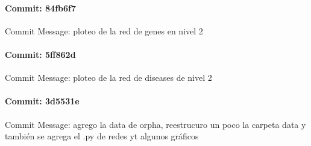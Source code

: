 \documentclass{article}
\begin{document}
\paragraph{Commit: 84fb6f7}
Commit Message: ploteo de la red de genes en nivel 2

\paragraph{Commit: 5ff862d}
Commit Message: ploteo de la red de diseases de nivel 2

\paragraph{Commit: 3d5531e}
Commit Message: agrego la data de orpha, reestrucuro un poco la carpeta data y también se agrega el .py de redes yt algunos gráficos

\end{document}
